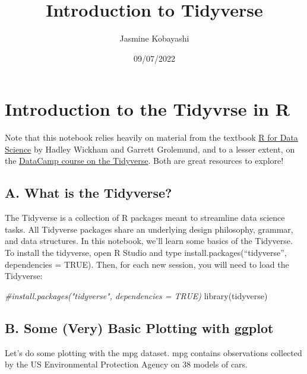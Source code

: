 \documentclass[
]{article}
\title{Introduction to Tidyverse}
\author{Jasmine Kobayashi}
\date{09/07/2022}
\newenvironment{Shaded}{\begin{snugshade}}{\end{snugshade}}
\newcommand{\CommentTok}[1]{\textcolor[rgb]{0.56,0.35,0.01}{\textit{#1}}}
\newcommand{\FunctionTok}[1]{\textcolor[rgb]{0.00,0.00,0.00}{#1}}
\newcommand{\NormalTok}[1]{#1}
\begin{document}
\maketitle

\hypertarget{introduction-to-the-tidyvrse-in-r}{%
\section{Introduction to the Tidyvrse in
R}\label{introduction-to-the-tidyvrse-in-r}}

Note that this notebook relies heavily on material from the textbook
\href{https://r4ds.had.co.nz/index.html}{R for Data Science} by Hadley
Wickham and Garrett Grolemund, and to a lesser extent, on the
\href{https://www.datacamp.com/courses/introduction-to-the-tidyverse}{DataCamp
course on the Tidyverse}. Both are great resources to explore!

\hypertarget{a.-what-is-the-tidyverse}{%
\subsection{A. What is the Tidyverse?}\label{a.-what-is-the-tidyverse}}

The Tidyverse is a collection of R packages meant to streamline data
science tasks. All Tidyverse packages share an underlying design
philosophy, grammar, and data structures. In this notebook, we'll learn
some basics of the Tidyverse. To install the tidyverse, open R Studio
and type install.packages(``tidyverse'', dependencies = TRUE). Then, for
each new session, you will need to load the Tidyverse:

\begin{Shaded}
\begin{Highlighting}[]
\CommentTok{\#install.packages("tidyverse", dependencies = TRUE)}
\FunctionTok{library}\NormalTok{(tidyverse)}
\end{Highlighting}
\end{Shaded}

\hypertarget{b.-some-very-basic-plotting-with-ggplot}{%
\subsection{B. Some (Very) Basic Plotting with
ggplot}\label{b.-some-very-basic-plotting-with-ggplot}}

Let's do some plotting with the mpg dataset. mpg contains observations
collected by the US Environmental Protection Agency on 38 models of
cars.
\end{document}
